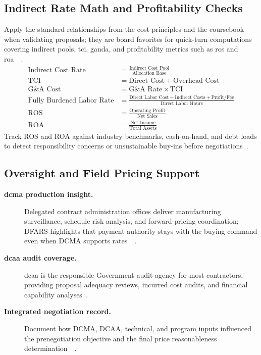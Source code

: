 \documentclass[../main.tex]{subfiles}
\begin{document}
\subsection{Indirect Rate Math and Profitability Checks}
Apply the standard relationships from the cost principles and the coursebook when validating proposals; they are board favorites for quick-turn computations covering indirect pools, \ac{tci}, \ac{ganda}, and profitability metrics such as \ac{ros} and \ac{roa}~\autocite[\S\S~31.201-2, 31.202, 31.203]{FAR}~\autocite{edo-3-2-4-cost-price-evaluation-2024}.
\begin{align}
	\text{Indirect Cost Rate} &= \frac{\text{Indirect Cost Pool}}{\text{Allocation Base}}\label{eq:indirect_rate}\\
	\text{TCI} &= \text{Direct Cost} + \text{Overhead Cost}\label{eq:tci}\\
	\text{G\&A Cost} &= \text{G\&A Rate} \times \text{TCI}\label{eq:ganda_cost}\\
	\text{Fully Burdened Labor Rate} &= \frac{\text{Direct Labor Cost} + \text{Indirect Costs} + \text{Profit/Fee}}{\text{Direct Labor Hours}}\label{eq:fully_burdened}\\
	\text{ROS} &= \frac{\text{Operating Profit}}{\text{Net Sales}}\label{eq:ros}\\
	\text{ROA} &= \frac{\text{Net Income}}{\text{Total Assets}}\label{eq:roa}
\end{align}
Track ROS and ROA against industry benchmarks, cash-on-hand, and debt loads to detect responsibility concerns or unsustainable buy-ins before negotiations~\autocite{edo-3-2-4-cost-price-evaluation-2024}.

\subsection{Oversight and Field Pricing Support}
\begin{description}
	\item[\textbf{\ac{dcma} production insight.}] Delegated contract administration offices deliver manufacturing surveillance, schedule risk analysis, and forward-pricing coordination; DFARS highlights that payment authority stays with the buying command even when DCMA supports rates~\autocite[\S~242.302(a)(13)(A)]{DFARS}~\autocite{edo-3-2-4-cost-price-evaluation-2024}.
	\item[\textbf{\ac{dcaa} audit coverage.}] \ac{dcaa} is the responsible Government audit agency for most contractors, providing proposal adequacy reviews, incurred cost audits, and financial capability analyses~\autocite[\S~42.101(b)]{FAR}.
	\item[\textbf{Integrated negotiation record.}] Document how DCMA, DCAA, technical, and program inputs influenced the prenegotiation objective and the final price reasonableness determination~\autocite[\S~15.404-1(a)(5)]{FAR}~\autocite{edo-3-2-4-cost-price-evaluation-2024}.
\end{description}
\end{document}
